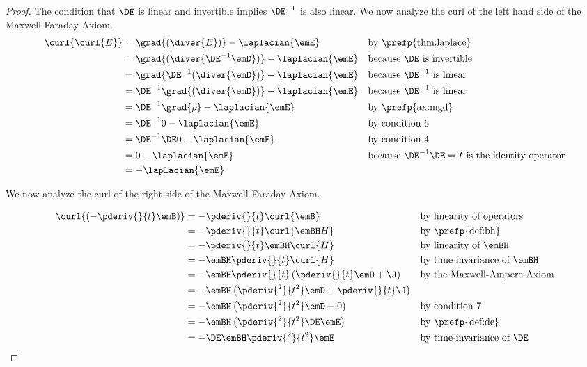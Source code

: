 \begin{proof}
The condition that $\DE$ is linear and invertible implies $\DE^{-1}$ is also linear.
We now analyze the curl of the left hand side of the Maxwell-Faraday Axiom.
\begin{align*}
   \curl{\curl{E}}
     &= \grad{(\diver{E})} - \laplacian{\emE}
     && \text{by \prefp{thm:laplace}}
   \\&= \grad{(\diver{\DE^{-1}\emD})} - \laplacian{\emE}
     && \text{because $\DE$ is invertible}
   \\&= \grad{\DE^{-1}(\diver{\emD})} - \laplacian{\emE}
     && \text{because $\DE^{-1}$ is linear}
   \\&= \DE^{-1}\grad{(\diver{\emD})} - \laplacian{\emE}
     && \text{because $\DE^{-1}$ is linear}
   \\&= \DE^{-1}\grad{\rho} - \laplacian{\emE}
     && \text{by \prefp{ax:mgd}}
   \\&= \DE^{-1}0 - \laplacian{\emE}
     && \text{by condition 6}
   \\&= \DE^{-1}\DE 0 - \laplacian{\emE}
     && \text{by condition 4}
   \\&= 0 - \laplacian{\emE}
     && \text{because $\DE^{-1}\DE=I$ is the identity operator}
   \\ &= - \laplacian{\emE}
\end{align*}


We now analyze the curl of the right side of the Maxwell-Faraday Axiom.


\begin{align*}
   \curl{\left( -\pderiv{}{t}\emB \right)}
     &= -\pderiv{}{t}\curl{\emB}
     && \text{by linearity of operators}
   \\&= -\pderiv{}{t}\curl{\emBH H}
     &&\text{by \prefp{def:bh}}
   \\&= -\pderiv{}{t}\emBH \curl{H}
     && \text{by linearity of $\emBH$}
   \\&= -\emBH \pderiv{}{t} \curl{H}
     && \text{by time-invariance of $\emBH$}
   \\&= -\emBH \pderiv{}{t} \left( \pderiv{}{t}\emD + \J   \right)
     && \text{by the Maxwell-Ampere Axiom}
   \\&= -\emBH \left( \pderiv{^2}{t^2}\emD + \pderiv{}{t}\J   \right)
   \\&= -\emBH \left( \pderiv{^2}{t^2}\emD + 0  \right)
     && \text{by condition 7}
   \\&= -\emBH \left( \pderiv{^2}{t^2}\DE\emE  \right)
     && \text{by \prefp{def:de}}
   \\&= -\DE \emBH \pderiv{^2}{t^2}\emE
     && \text{by time-invariance of $\DE$ }
\end{align*}




\end{proof}

